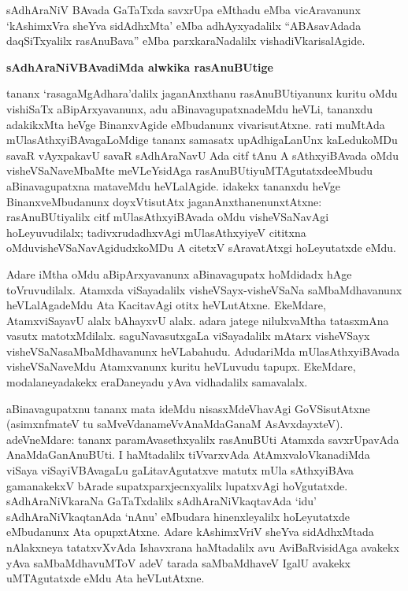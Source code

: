 sAdhAraNiV BAvada GaTaTxda savxrUpa eMthadu eMba vicAravanunx `kAshimxVra sheYva sidAdhxMta' eMba adhAyxyadalilx ``ABAsavAdada daqSiTxyalilx rasAnuBava'' eMba parxkaraNadalilx vishadiVkarisalAgide.

\bigskip
\begin{center}
{\Large\bf sAdhAraNiVBAvadiMda alwkika rasAnuBUtige}
\end{center}

tananx `rasagaMgAdhara'dalilx jaganAnxthanu rasAnuBUtiyanunx kuritu oMdu vishiSaTx aBipArxyavanunx, adu aBinavagupatxnadeMdu heVLi, tananxdu adakikxMta heVge BinanxvAgide eMbudanunx vivarisutAtxne. rati muMtAda mUlasAthxyiBAvagaLoMdige tananx samasatx upAdhigaLanUnx kaLedukoMDu savaR vAyxpakavU savaR sAdhAraNavU Ada citf tAnu A sAthxyiBAvada oMdu visheVSaNaveMbaMte meVLeYsidAga rasAnuBUtiyuMTAgutatxde\break eMbudu aBinavagupatxna mataveMdu heVLalAgide. idakekx tananxdu heVge Binanx\-veMbudanunx doyxVtisutAtx jaganAnxthanenunxtAtxne: rasAnuBUtiyalilx citf mUlasAthxyiBAvada oMdu visheVSaNavAgi hoLeyuvudilalx; tadivxrudadhxvAgi mUlasAthxyiyeV cititxna oMdu\break visheVSaNavAgidudxkoMDu A citetxV sAravatAtxgi hoLeyutatxde eMdu.

Adare iMtha oMdu aBipArxyavanunx aBinavagupatx hoMdidadx hAge toVruvu\-dilalx. Atamxda viSayadalilx visheVSayx-visheVSaNa saMbaMdhavanunx heVLalAgadeMdu Ata KacitavAgi otitx heVLutAtxne. EkeMdare, AtamxviSayavU alalx bAhayxvU alalx. adara jatege nilulxvaMtha tatasxmAna vasutx matotxMdilalx. saguNavasutxgaLa viSayadalilx mAtarx visheVSayx visheVSaNasaMbaMdhavanunx heVLabahudu. AdudariMda mUlasAthxyiBAvada visheVSaNaveMdu Atamxvanunx kuritu heVLuvudu tapupx. EkeMdare, modalaneyadakekx eraDaneyadu yAva vidhadalilx samavalalx.

aBinavagupatxnu tananx mata ideMdu nisasxMdeVhavAgi GoVSisutAtxne (asimxnfmateV tu saMveVdanameVvAnaMdaGanaM AsAvxdayxteV). adeVneMdare: tananx paramAvasethxyalilx rasAnuBUti Atamxda savxrUpavAda AnaMdaGanAnuBUti. I haMtadalilx tiVvarxvAda AtAmxvaloVkanadiMda viSaya viSayiVBAvagaLu gaLitavAgutatxve matutx mUla sAthxyiBAva gamanakekxV bArade supatxparxjecnxyalilx lupatxvAgi hoVgutatxde. sAdhAraNiVkaraNa GaTaTxdalilx sAdhAraNiVkaqtavAda `idu' sAdhAraNiVkaqtanAda `nAnu' eMbudara hinenxleyalilx hoLeyutatxde eMbudanunx Ata opupxtAtxne. Adare kAshimxVriV sheYva sidAdhxMtada nAlakxneya tatatxvXvAda Ishavxrana haMtadalilx avu AviBaRvisidAga avakekx yAva saMbaMdhavuMToV adeV tarada saMbaMdhaveV IgalU avakekx uMTAgutatxde eMdu Ata heVLutAtxne.


